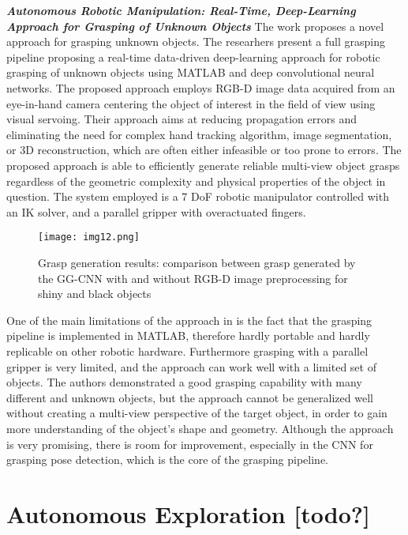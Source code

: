 \textbf{\textit{Autonomous Robotic Manipulation: Real-Time, Deep-Learning
		Approach for Grasping of Unknown Objects}} \quad
The work \cite{sayour2022unknowngrasping} proposes a novel approach for grasping unknown objects.
The researhers present a full grasping pipeline proposing a real-time data-driven
deep-learning approach for robotic grasping of unknown objects using MATLAB and
deep convolutional neural networks. The proposed approach employs RGB-D image data
acquired from an eye-in-hand camera centering the object of interest in the field of
view using visual servoing. Their approach aims at reducing propagation errors
and eliminating the need for complex hand tracking algorithm, image segmentation,
or 3D reconstruction, which are often either infeasible or too prone to errors.
The proposed approach is able to efficiently generate reliable multi-view object grasps
regardless of the geometric complexity and physical properties of the object in question.
The system employed is a 7 DoF robotic manipulator controlled with an IK solver,
and a parallel gripper with overactuated fingers.

\begin{figure}[H]
	\centering
	\texttt{[image: img12.png]}
	\captionsetup{width=1\linewidth}
	\caption{Grasp generation results: comparison between grasp generated by the GG-CNN
		with and without RGB-D image preprocessing for shiny and black objects
		\cite{sayour2022unknowngrasping}}
	\label{fig:img12}
\end{figure}

One of the main limitations of the approach in \cite{sayour2022unknowngrasping} is the fact
that the grasping pipeline is implemented in MATLAB, therefore hardly portable and hardly
replicable on other robotic hardware. Furthermore grasping with a parallel gripper is
very limited, and the approach can work well with a limited set of objects. The authors
demonstrated a good grasping capability with many different and unknown objects, but
the approach cannot be generalized well without creating a multi-view perspective of
the target object, in order to gain more understanding of the object's shape and
geometry. Although the approach is very promising, there is room for improvement,
especially in the CNN for grasping pose detection, which is the core of the grasping pipeline.




\section{Autonomous Exploration [todo?]}

